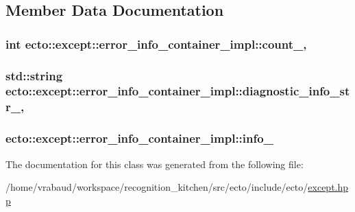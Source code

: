 \subsection{Member Data Documentation}
\hypertarget{classecto_1_1except_1_1error__info__container__impl_ade4abdc4aa11c62dd39847bc4f6c619c}{}
\subsubsection[{count\+\_\+}]{\setlength{\rightskip}{0pt plus 5cm}int ecto\+::except\+::error\+\_\+info\+\_\+container\+\_\+impl\+::count\+\_\+\hspace{0.3cm}{\ttfamily [mutable]}, {\ttfamily [private]}}\label{classecto_1_1except_1_1error__info__container__impl_ade4abdc4aa11c62dd39847bc4f6c619c}
\hypertarget{classecto_1_1except_1_1error__info__container__impl_aeb86496a5127e19e9f787e77531b1b83}{}
\subsubsection[{diagnostic\+\_\+info\+\_\+str\+\_\+}]{\setlength{\rightskip}{0pt plus 5cm}std\+::string ecto\+::except\+::error\+\_\+info\+\_\+container\+\_\+impl\+::diagnostic\+\_\+info\+\_\+str\+\_\+\hspace{0.3cm}{\ttfamily [mutable]}, {\ttfamily [private]}}\label{classecto_1_1except_1_1error__info__container__impl_aeb86496a5127e19e9f787e77531b1b83}
\hypertarget{classecto_1_1except_1_1error__info__container__impl_a8ec60b174805696bd691a894b7f4109f}{}
\subsubsection[{info\+\_\+}]{ ecto\+::except\+::error\+\_\+info\+\_\+container\+\_\+impl\+::info\+\_\+\hspace{0.3cm}{\ttfamily [private]}}\label{classecto_1_1except_1_1error__info__container__impl_a8ec60b174805696bd691a894b7f4109f}


The documentation for this class was generated from the following file\+:\begin{DoxyCompactItemize}
\item 
/home/vrabaud/workspace/recognition\+\_\+kitchen/src/ecto/include/ecto/\hyperlink{except_8hpp}{except.\+hpp}\end{DoxyCompactItemize}
